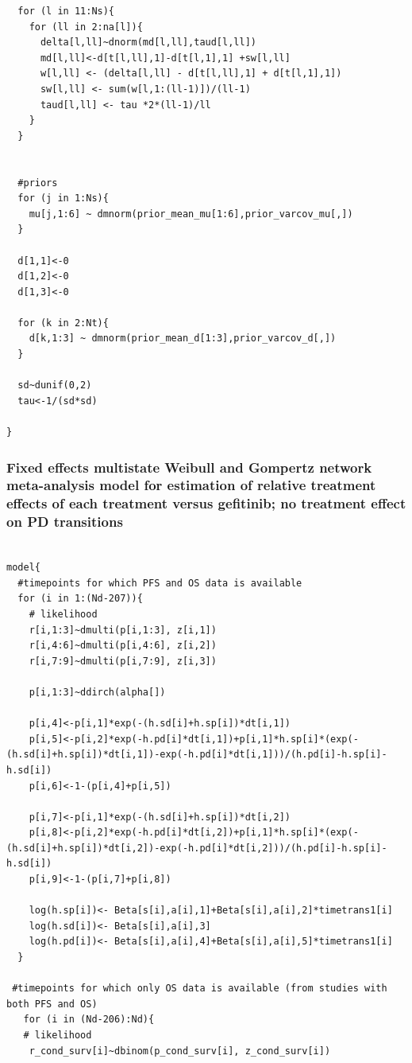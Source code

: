 \documentclass[11pt,final,fleqn]{article}\usepackage[]{graphicx}\usepackage[]{color}
\theoremstyle{plain}
\begin{document}
\begin{appendices}
\begin{verbatim}
  for (l in 11:Ns){
    for (ll in 2:na[l]){
      delta[l,ll]~dnorm(md[l,ll],taud[l,ll])
      md[l,ll]<-d[t[l,ll],1]-d[t[l,1],1] +sw[l,ll]
      w[l,ll] <- (delta[l,ll] - d[t[l,ll],1] + d[t[l,1],1])
      sw[l,ll] <- sum(w[l,1:(ll-1)])/(ll-1) 
      taud[l,ll] <- tau *2*(ll-1)/ll 
    }
  }
  
  
  #priors
  for (j in 1:Ns){
    mu[j,1:6] ~ dmnorm(prior_mean_mu[1:6],prior_varcov_mu[,]) 
  }
  
  d[1,1]<-0
  d[1,2]<-0
  d[1,3]<-0

  for (k in 2:Nt){
    d[k,1:3] ~ dmnorm(prior_mean_d[1:3],prior_varcov_d[,]) 
  }
  
  sd~dunif(0,2)
  tau<-1/(sd*sd)
  
}

\end{verbatim}

\subsubsection{Fixed effects multistate Weibull and Gompertz network meta-analysis model for estimation of relative treatment effects of each treatment versus gefitinib; no treatment effect on PD transitions}
\begin{verbatim} 

model{
  #timepoints for which PFS and OS data is available
  for (i in 1:(Nd-207)){
    # likelihood
    r[i,1:3]~dmulti(p[i,1:3], z[i,1]) 
    r[i,4:6]~dmulti(p[i,4:6], z[i,2]) 
    r[i,7:9]~dmulti(p[i,7:9], z[i,3]) 
    
    p[i,1:3]~ddirch(alpha[])
    
    p[i,4]<-p[i,1]*exp(-(h.sd[i]+h.sp[i])*dt[i,1])
    p[i,5]<-p[i,2]*exp(-h.pd[i]*dt[i,1])+p[i,1]*h.sp[i]*(exp(-(h.sd[i]+h.sp[i])*dt[i,1])-exp(-h.pd[i]*dt[i,1]))/(h.pd[i]-h.sp[i]-h.sd[i])
    p[i,6]<-1-(p[i,4]+p[i,5])
    
    p[i,7]<-p[i,1]*exp(-(h.sd[i]+h.sp[i])*dt[i,2])
    p[i,8]<-p[i,2]*exp(-h.pd[i]*dt[i,2])+p[i,1]*h.sp[i]*(exp(-(h.sd[i]+h.sp[i])*dt[i,2])-exp(-h.pd[i]*dt[i,2]))/(h.pd[i]-h.sp[i]-h.sd[i])
    p[i,9]<-1-(p[i,7]+p[i,8])
    
    log(h.sp[i])<- Beta[s[i],a[i],1]+Beta[s[i],a[i],2]*timetrans1[i] 
    log(h.sd[i])<- Beta[s[i],a[i],3] 
    log(h.pd[i])<- Beta[s[i],a[i],4]+Beta[s[i],a[i],5]*timetrans1[i]
  }
  
 #timepoints for which only OS data is available (from studies with both PFS and OS)
   for (i in (Nd-206):Nd){
   # likelihood
    r_cond_surv[i]~dbinom(p_cond_surv[i], z_cond_surv[i]) 
    

\end{verbatim}
\end{appendices}
\end{document}
